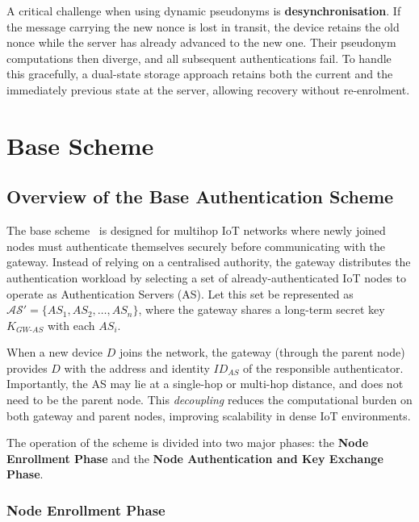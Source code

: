 \documentclass[12pt,a4paper]{report}
\begin{document}
A critical challenge when using dynamic pseudonyms is \textbf{desynchronisation}.
If the message carrying the new nonce is lost in transit, the device retains the old
nonce while the server has already advanced to the new one.
Their pseudonym computations then diverge, and all subsequent authentications fail.
To handle this gracefully, a dual-state storage approach retains both the current and
the immediately previous state at the server, allowing recovery without re-enrolment.

\chapter{Base Scheme}

\section{Overview of the Base Authentication Scheme}

The base scheme~\cite{das2026comsnets} is designed for multihop IoT networks where
newly joined nodes must authenticate themselves securely before communicating with
the gateway.
Instead of relying on a centralised authority, the gateway distributes the
authentication workload by selecting a set of already-authenticated IoT nodes to
operate as Authentication Servers (AS).
Let this set be represented as $\mathcal{AS}' = \{AS_1, AS_2, \ldots, AS_n\}$,
where the gateway shares a long-term secret key $K_{GW\text{-}AS}$ with each $AS_i$.

When a new device $D$ joins the network, the gateway (through the parent node)
provides $D$ with the address and identity $ID_{AS}$ of the responsible
authenticator.
Importantly, the AS may lie at a single-hop or multi-hop distance, and does not need
to be the parent node.
This \emph{decoupling} reduces the computational burden on both gateway and parent
nodes, improving scalability in dense IoT environments.

The operation of the scheme is divided into two major phases: the
\textbf{Node Enrollment Phase} and the \textbf{Node Authentication and Key Exchange
Phase}.

\subsection{Node Enrollment Phase}
\end{document}
